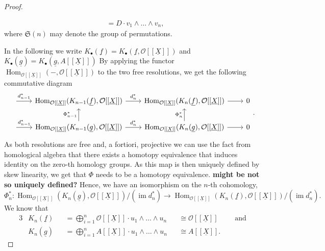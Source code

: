 \documentclass{article}
\theoremstyle{plain}%
\theoremstyle{definition}
\theoremstyle{remark}
\newcommand{\im}{\operatorname{im}}
\renewcommand{\hom}{\operatorname{Hom}}
\begin{document}
\begin{proof}
\begin{enumerate}
\begin{align*}
            &= D \cdot v_1 \wedge \dots \wedge v_n,
        \end{align*}
        where \(\mathfrak{S}(n)\) may denote the group of permutations.
    \end{enumerate}
    In the following we write 
    \(K_\bullet(\underline{f}) = K_\bullet(\underline{f}, \mathcal{O}[[\underline{X}]])\)
    and 
    \(K_\bullet(\underline{g}) = K_\bullet(\underline{g}, A[[\underline{X}]])\)
    By applying the functor \(\hom_{\mathcal{O}[[\underline{X}]]}(-, \mathcal{O}[[\underline{X}]])\)
    to the two free resolutions, we get the following commutative diagram
    \[
        \begin{tikzcd}[column sep=2.2em]
            \arrow[r, "d_{n-1}^*"] & 
            \hom_{\mathcal{O}[[\underline{X}]]}(K_{n-1}(\underline{f}), \mathcal{O}[[\underline{X}]]) 
            \arrow[r, "d_n^*"] &
            \hom_{\mathcal{O}[[\underline{X}]]}(K_n(\underline{f}), \mathcal{O}[[\underline{X}]]) 
            \arrow[r] & 0\\
            \arrow[r, "d_{n-1}^*"] & 
            \hom_{\mathcal{O}[[\underline{X}]]}(K_{n-1}(\underline{g}), \mathcal{O}[[\underline{X}]])
            \arrow[r, "d_n^*"] \arrow[u, "\Phi_{n-1}^*"] &
            \hom_{\mathcal{O}[[\underline{X}]]}(K_n(\underline{g}), \mathcal{O}[[\underline{X}]]) 
            \arrow[r] \arrow[u, "\Phi_{n}^*"] & 0
        \end{tikzcd}.
    \]
    As both resolutions are free and, a fortiori, projective we can use the fact from homological algebra
    that there exists a homotopy equivalence that induces identity on the zero-th homology groups.
    As this map is then uniquely defined by skew linearity, we get that \(\Phi\) needs to be a homotopy equivalence.
    \textbf{might be not so uniquely defined?}
    Hence, we have an isomorphism on the \(n\)-th cohomology,
    \[
        \Phi_n^*\colon \hom_{\mathcal{O}[[\underline{X}]]}(K_n(\underline{g}), \mathcal{O}[[\underline{X}]])/(\im d_n^*)
        \to \hom_{\mathcal{O}[[\underline{X}]]}(K_n(\underline{f}), \mathcal{O}[[\underline{X}]])/(\im d_n^*).
    \]
    We know that 
    \begin{alignat*}{3}
        &K_n(\underline{f}) &&= \bigoplus_{i = 1}^n \mathcal{O}[[\underline{X}]] \cdot u_1\wedge\dots\wedge u_n
        &&\cong \mathcal{O}[[\underline{X}]]\qquad\text{ and}\\
        &K_n(\underline{g}) &&= \bigoplus_{i = 1}^n A[[\underline{X}]] \cdot u_1\wedge\dots\wedge u_n 
        &&\cong A[[\underline{X}]]. 
    \end{alignat*}

\end{proof}
\end{document}
